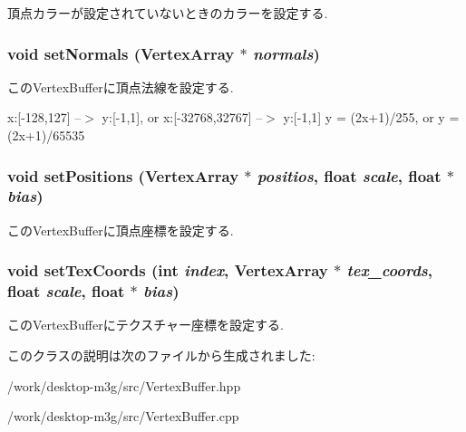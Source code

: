 頂点カラーが設定されていないときのカラーを設定する. \hypertarget{classm3g_1_1VertexBuffer_4aabe6277538d5aa8285759dab85002a}{
\subsubsection[{setNormals}]{\setlength{\rightskip}{0pt plus 5cm}void setNormals ({\bf VertexArray} $\ast$ {\em normals})}}
\label{classm3g_1_1VertexBuffer_4aabe6277538d5aa8285759dab85002a}


このVertexBufferに頂点法線を設定する.

x:\mbox{[}-128,127\mbox{]} --$>$ y:\mbox{[}-1,1\mbox{]}, or x:\mbox{[}-32768,32767\mbox{]} --$>$ y:\mbox{[}-1,1\mbox{]} y = (2x+1)/255, or y = (2x+1)/65535 \hypertarget{classm3g_1_1VertexBuffer_527460407f488d5128bae7d0adb6da43}{
\subsubsection[{setPositions}]{\setlength{\rightskip}{0pt plus 5cm}void setPositions ({\bf VertexArray} $\ast$ {\em positios}, \/  float {\em scale}, \/  float $\ast$ {\em bias})}}
\label{classm3g_1_1VertexBuffer_527460407f488d5128bae7d0adb6da43}


このVertexBufferに頂点座標を設定する. \hypertarget{classm3g_1_1VertexBuffer_9fd3dd3f78138d654d18863e4f1329f4}{
\subsubsection[{setTexCoords}]{\setlength{\rightskip}{0pt plus 5cm}void setTexCoords (int {\em index}, \/  {\bf VertexArray} $\ast$ {\em tex\_\-coords}, \/  float {\em scale}, \/  float $\ast$ {\em bias})}}
\label{classm3g_1_1VertexBuffer_9fd3dd3f78138d654d18863e4f1329f4}


このVertexBufferにテクスチャー座標を設定する. 

このクラスの説明は次のファイルから生成されました:\begin{CompactItemize}
\item 
/work/desktop-m3g/src/VertexBuffer.hpp\item 
/work/desktop-m3g/src/VertexBuffer.cpp\end{CompactItemize}
